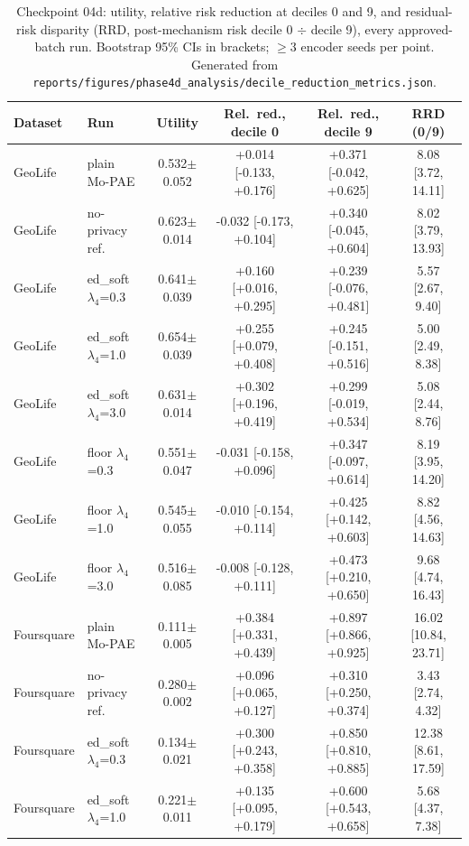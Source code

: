 \begin{table}[t]
\centering
\caption{Checkpoint 04d: utility, relative risk reduction at deciles 0 and 9, and residual-risk disparity (RRD, post-mechanism risk decile 0 $\div$ decile 9), every approved-batch run. Bootstrap 95\% CIs in brackets; $\geq 3$ encoder seeds per point. Generated from \texttt{reports/figures/phase4d\_analysis/decile\_reduction\_metrics.json}.}
\label{tab:04d-decile-reduction}
\small
\begin{tabular}{@{}llcccc@{}}
\toprule
Dataset & Run & Utility & Rel.\ red., decile 0 & Rel.\ red., decile 9 & RRD (0/9) \\
\midrule
GeoLife & plain Mo-PAE & 0.532$\pm$0.052 & +0.014 [-0.133, +0.176] & +0.371 [-0.042, +0.625] & 8.08 [3.72, 14.11] \\
GeoLife & no-privacy ref. & 0.623$\pm$0.014 & -0.032 [-0.173, +0.104] & +0.340 [-0.045, +0.604] & 8.02 [3.79, 13.93] \\
GeoLife & ed\_soft $\lambda_4$=0.3 & 0.641$\pm$0.039 & +0.160 [+0.016, +0.295] & +0.239 [-0.076, +0.481] & 5.57 [2.67, 9.40] \\
GeoLife & ed\_soft $\lambda_4$=1.0 & 0.654$\pm$0.039 & +0.255 [+0.079, +0.408] & +0.245 [-0.151, +0.516] & 5.00 [2.49, 8.38] \\
GeoLife & ed\_soft $\lambda_4$=3.0 & 0.631$\pm$0.014 & +0.302 [+0.196, +0.419] & +0.299 [-0.019, +0.534] & 5.08 [2.44, 8.76] \\
GeoLife & floor $\lambda_4$=0.3 & 0.551$\pm$0.047 & -0.031 [-0.158, +0.096] & +0.347 [-0.097, +0.614] & 8.19 [3.95, 14.20] \\
GeoLife & floor $\lambda_4$=1.0 & 0.545$\pm$0.055 & -0.010 [-0.154, +0.114] & +0.425 [+0.142, +0.603] & 8.82 [4.56, 14.63] \\
GeoLife & floor $\lambda_4$=3.0 & 0.516$\pm$0.085 & -0.008 [-0.128, +0.111] & +0.473 [+0.210, +0.650] & 9.68 [4.74, 16.43] \\
\addlinespace
Foursquare & plain Mo-PAE & 0.111$\pm$0.005 & +0.384 [+0.331, +0.439] & +0.897 [+0.866, +0.925] & 16.02 [10.84, 23.71] \\
Foursquare & no-privacy ref. & 0.280$\pm$0.002 & +0.096 [+0.065, +0.127] & +0.310 [+0.250, +0.374] & 3.43 [2.74, 4.32] \\
Foursquare & ed\_soft $\lambda_4$=0.3 & 0.134$\pm$0.021 & +0.300 [+0.243, +0.358] & +0.850 [+0.810, +0.885] & 12.38 [8.61, 17.59] \\
Foursquare & ed\_soft $\lambda_4$=1.0 & 0.221$\pm$0.011 & +0.135 [+0.095, +0.179] & +0.600 [+0.543, +0.658] & 5.68 [4.37, 7.38] \\

\end{tabular}
\end{table}
